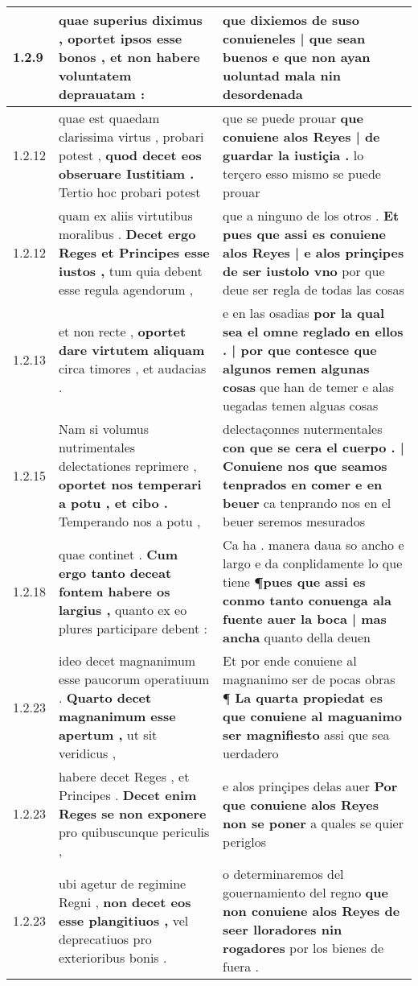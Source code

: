 \begin{tabular}{|p{1cm}|p{6.5cm}|p{6.5cm}|}
1.2.9 & quae superius diximus , \textbf{ oportet ipsos esse bonos , } et non habere voluntatem deprauatam : & que dixiemos de suso \textbf{ conuieneles | que sean buenos } e que non ayan uoluntad mala nin desordenada \\\hline
1.2.12 & quae est quaedam clarissima virtus , probari potest , \textbf{ quod decet eos obseruare Iustitiam . } Tertio hoc probari potest & que se puede prouar \textbf{ que conuiene alos Reyes | de guardar la iustiçia . } lo terçero esso mismo se puede prouar \\\hline
1.2.12 & quam ex aliis virtutibus moralibus . \textbf{ Decet ergo Reges et Principes esse iustos , } tum quia debent esse regula agendorum , & que a ninguno de los otros . \textbf{ Et pues que assi es conuiene alos Reyes | e alos prinçipes de ser iustolo vno } por que deue ser regla de todas las cosas \\\hline
1.2.13 & et non recte , \textbf{ oportet dare virtutem aliquam } circa timores , et audacias . & e en las osadias \textbf{ por la qual sea el omne reglado en ellos . | por que contesce que algunos remen algunas cosas } que han de temer e alas uegadas temen alguas cosas \\\hline
1.2.15 & Nam si volumus nutrimentales delectationes reprimere , \textbf{ oportet nos temperari a potu , et cibo . } Temperando nos a potu , & delectaçonnes nutermentales \textbf{ con que se cera el cuerpo . | Conuiene nos que seamos tenprados en comer e en beuer } ca tenprando nos en el beuer seremos mesurados \\\hline
1.2.18 & quae continet . \textbf{ Cum ergo tanto deceat fontem habere os largius , } quanto ex eo plures participare debent : & Ca ha . manera daua so ancho e largo e da conplidamente lo que tiene \textbf{ ¶pues que assi es conmo tanto conuenga ala fuente auer la boca | mas ancha } quanto della deuen \\\hline
1.2.23 & ideo decet magnanimum esse paucorum operatiuum . \textbf{ Quarto decet magnanimum esse apertum , } ut sit veridicus , & Et por ende conuiene al magnanimo ser de pocas obras ¶ \textbf{ La quarta propiedat es que conuiene al maguanimo ser magnifiesto } assi que sea uerdadero \\\hline
1.2.23 & habere decet Reges , et Principes . \textbf{ Decet enim Reges se non exponere } pro quibuscunque periculis , & e alos prinçipes delas auer \textbf{ Por que conuiene alos Reyes non se poner } a quales se quier periglos \\\hline
1.2.23 & ubi agetur de regimine Regni , \textbf{ non decet eos esse plangitiuos , } vel deprecatiuos pro exterioribus bonis . & o determinaremos del gouernamiento del regno \textbf{ que non conuiene alos Reyes de seer lloradores nin rogadores } por los bienes de fuera . \\\hline

\end{tabular}
